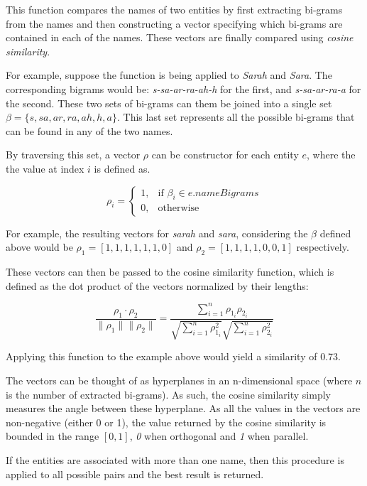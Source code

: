 \documentclass[epsfig,a4paper,11pt,titlepage,twoside,openany]{book}
\begin{document}
This function compares the names of two entities by first extracting bi-grams from the names and then constructing a vector specifying which bi-grams are contained in each of the names. These vectors are finally compared using \textit{cosine similarity}. 

For example, suppose the function is being applied to \textit{Sarah} and \textit{Sara}. The corresponding bigrams would be: \textit{s-sa-ar-ra-ah-h} for the first, and \textit{s-sa-ar-ra-a} for the second. These two sets of bi-grams can them be joined into a single set $\beta = \{s, sa, ar, ra, ah, h, a\}$. This last set represents all the possible bi-grams that can be found in any of the two names. 

By traversing this set, a vector $\rho$ can be constructor for each entity $e$, where the the value at index $i$ is defined as. 

\begin{equation*}
\rho_i = \begin{cases}
            1, & \text{if } \beta_i \in e.nameBigrams \\
            0, & \text{otherwise}
        \end{cases} 
\end{equation*}

For example, the resulting vectors for \textit{sarah} and \textit{sara}, considering the $\beta$ defined above would be $\rho_1 = [1, 1, 1, 1, 1, 1, 0]$ and $\rho_2 = [1, 1, 1, 1, 0, 0, 1]$ respectively.

These vectors can then be passed to the cosine similarity function, which is defined as the dot product of the vectors normalized by their lengths:

$$
\frac{\rho_1 \cdot \rho_2}{\|\rho_1\| \|\rho_2\|} = \frac{
\sum_{i=1}^n \rho_{1_i} \rho_{2_i}}{
\sqrt{\sum_{i=1}^n \rho_{1_i}^2}
\sqrt{\sum_{i=1}^n \rho_{2_i}^2}
}
$$

Applying this function to the example above would yield a similarity of 0.73. 

The vectors can be thought of as hyperplanes in an n-dimensional space (where $n$ is the number of extracted bi-grams). As such, the cosine similarity simply measures the angle between these hyperplane. As all the values in the vectors are non-negative (either 0 or 1), the value returned by the cosine similarity is bounded in the range $[0,1]$, \textit{0} when orthogonal and \textit{1} when parallel.

If the entities are associated with more than one name, then this procedure is applied to all possible pairs and the best result is returned.
\end{document}
